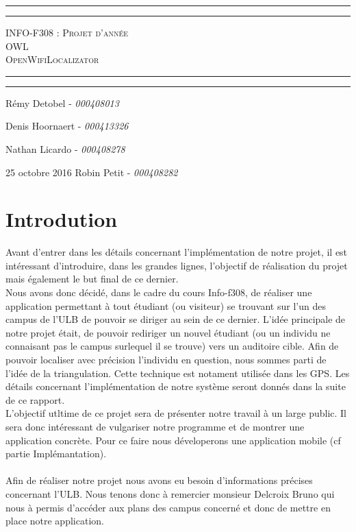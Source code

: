\documentclass[11pt,a4paper]{article}
\title{}
\author{}
\begin{document}
\begin{center}
    \vspace*{\fill}
        \hrule
        \vspace*{2pt}
        \hrule
        \vspace*{15pt}
        \textsc{\Huge{INFO-F308 : Projet d'année \\\vspace*{8pt}
            OWL\\\vspace*{12pt}
            OpenWifiLocalizator}}
        \vspace*{15pt}
        \hrule
        \vspace*{2pt}
        \hrule
  \vspace*{\fill}
\end{center}
\null
\vfill

\large
\hfill Rémy Detobel - \emph{000408013}

\hfill Denis Hoornaert - \emph{000413326}

\hfill Nathan Licardo - \emph{000408278}

25 octobre 2016 \hfill Robin Petit - \emph{000408282}
\newpage



\section{Introdution}
Avant d'entrer dans les détails concernant l'implémentation de notre projet, il est intéressant d'introduire, dans les grandes lignes, l'objectif de réalisation du projet mais également le but final de ce dernier.\\
Nous avons donc décidé, dans le cadre du cours Info-f308, de réaliser une application permettant à tout étudiant (ou visiteur) se trouvant sur l'un des campus de l'ULB de pouvoir se diriger au sein de ce dernier. L'idée principale de notre projet était, de pouvoir rediriger un nouvel étudiant (ou un individu ne connaisant pas le campus surlequel il se trouve) vers un auditoire cible. Afin de pouvoir localiser avec précision l'individu en question, nous sommes parti de l'idée de la triangulation. Cette technique est notament utilisée dans les GPS. Les détails concernant l'implémentation de notre système seront donnés dans la suite de ce rapport.\\
L'objectif utltime de ce projet sera de présenter notre travail à un large public. Il sera donc intéressant de \og vulgariser \fg{} notre programme et de montrer une application concrète. Pour ce faire nous déveloperons une application mobile (cf partie Implémantation).\\\\
Afin de réaliser notre projet nous avons eu besoin d'informations précises concernant l'ULB. Nous tenons donc à remercier monsieur Delcroix Bruno qui nous à permis d'accéder aux plans des campus concerné et donc de mettre en place notre application.
\end{document}
